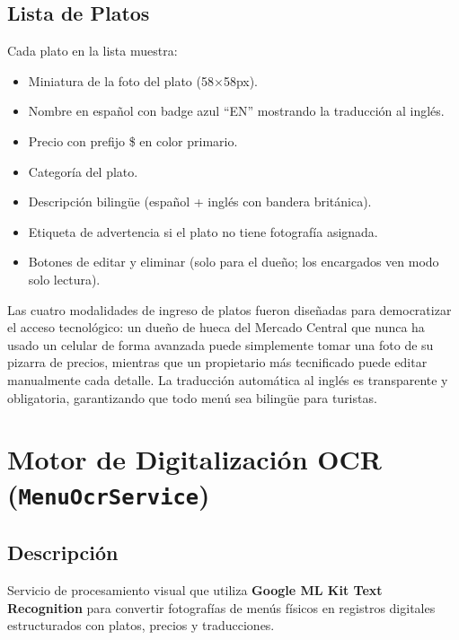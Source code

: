 \documentclass[11pt, a4paper, oneside]{report}
\begin{document}
\subsection{Lista de Platos}
Cada plato en la lista muestra:
\begin{itemize}
  \item Miniatura de la foto del plato (58$\times$58px).
  \item Nombre en español con badge azul ``EN'' mostrando la traducción al inglés.
  \item Precio con prefijo \$ en color primario.
  \item Categoría del plato.
  \item Descripción bilingüe (español + inglés con bandera británica).
  \item Etiqueta de advertencia si el plato no tiene fotografía asignada.
  \item Botones de editar y eliminar (solo para el dueño; los encargados ven modo solo lectura).
\end{itemize}

\begin{decisionbox}
Las cuatro modalidades de ingreso de platos fueron diseñadas para democratizar el acceso tecnológico: un dueño de hueca del Mercado Central que nunca ha usado un celular de forma avanzada puede simplemente tomar una foto de su pizarra de precios, mientras que un propietario más tecnificado puede editar manualmente cada detalle. La traducción automática al inglés es transparente y obligatoria, garantizando que todo menú sea bilingüe para turistas.
\end{decisionbox}

\section{Motor de Digitalización OCR (\texttt{MenuOcrService})}

\subsection{Descripción}
Servicio de procesamiento visual que utiliza \textbf{Google ML Kit Text Recognition} para convertir fotografías de menús físicos en registros digitales estructurados con platos, precios y traducciones.
\end{document}

